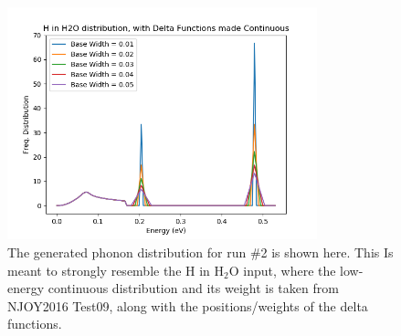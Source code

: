 \documentclass[a4paper]{article}
\begin{document}
\begin{figure}[H]
\centering
\includegraphics[width=0.8\textwidth]{phononDist_run2}
\caption{\label{fig:run2}The generated phonon distribution for run \#2 is shown here. This Is meant to strongly resemble the H in H$_2$O input, where the low-energy continuous distribution and its weight is taken from NJOY2016 Test09, along with the positions/weights of the delta functions. }
\end{figure}
\end{document}
